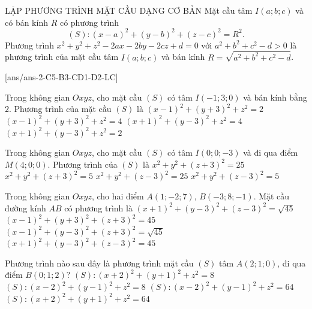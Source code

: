 \begin{dang}{LẬP PHƯƠNG TRÌNH MẶT CẦU DẠNG CƠ BẢN}
	Mặt cầu tâm $I(a;b;c)$ và có bán kính $R$ có phương trình $$(S)\colon{(x-a)^2}+(y-b)^2+(z-c)^2=R^2.$$	
	Phương trình $x^2+y^2+z^2-2ax-2by-2cz+d=0$ với $a^2+b^2+c^2-d>0$ là phương trình của mặt cầu tâm $I(a;b;c)$ và bán kính $R=\sqrt{a^2+b^2+c^2-d}$.	
\end{dang}
\TN
{}[ans/ans-2-C5-B3-CD1-D2-LC]
\begin{ex}%
	Trong không gian $Oxyz$, cho mặt cầu $(S)$ có tâm $I(-1;3;0)$ và bán kính bằng $2$. Phương trình của mặt cầu $(S)$ là
	\choice
	{$(x-1)^2+(y+3)^2+z^2=2$}
	{$(x-1)^2+(y+3)^2+z^2=4$}
	{\True $(x+1)^2+(y-3)^2+z^2=4$}
	{$(x+1)^2+(y-3)^2+z^2=2$}
\end{ex}

\begin{ex}%
	Trong không gian $Oxyz$, cho mặt cầu $(S)$ có tâm $I(0;0;-3)$ và đi qua điểm $M(4;0;0)$. Phương trình của $(S)$ là
	\choice
	{\True $x^2+y^2+(z+3)^2=25$}
	{$x^2+y^2+(z+3)^2=5$}
	{$x^2+y^2+(z-3)^2=25$}
	{$x^2+y^2+(z-3)^2=5$}
\end{ex}

\begin{ex}%
	Trong không gian $Oxyz$, cho hai điểm $A(1;-2;7)$, $B(-3;8;-1)$. Mặt cầu đường kính $AB$ có phương trình là
	\choice
	{$(x+1)^2+(y-3)^2+(z-3)^2=\sqrt{45}$}
	{$(x-1)^2+(y+3)^2+(z+3)^2=45$}
	{$(x-1)^2+(y-3)^2+(z+3)^2=\sqrt{45}$}
	{\True $(x+1)^2+(y-3)^2+(z-3)^2=45$}
\end{ex}

\begin{ex}%
	Phương trình nào sau đây là phương trình mặt cầu $(S)$ tâm $A(2;1;0)$, đi qua điểm $B(0;1;2)$?
	\choice
	{$(S)\colon{(x+2)^2}+(y+1)^2+z^2=8$}
	{\True $(S)\colon{(x-2)^2}+(y-1)^2+z^2=8$}
	{$(S)\colon{(x-2)^2}+(y-1)^2+z^2=64$}
	{$(S)\colon{(x+2)^2}+(y+1)^2+z^2=64$}
\end{ex}

